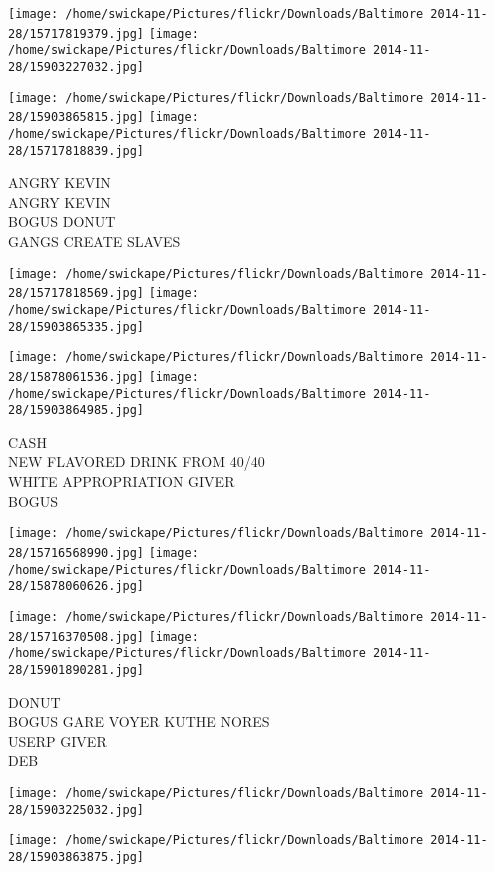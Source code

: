 \documentclass[10pt,letterpaper]{article}
\begin{document}
\texttt{[image: /home/swickape/Pictures/flickr/Downloads/Baltimore 2014-11-28/15717819379.jpg]}
\texttt{[image: /home/swickape/Pictures/flickr/Downloads/Baltimore 2014-11-28/15903227032.jpg]}

\texttt{[image: /home/swickape/Pictures/flickr/Downloads/Baltimore 2014-11-28/15903865815.jpg]}
\texttt{[image: /home/swickape/Pictures/flickr/Downloads/Baltimore 2014-11-28/15717818839.jpg]}

ANGRY KEVIN\\
ANGRY KEVIN\\
BOGUS DONUT\\
GANGS CREATE SLAVES
\pagebreak

\texttt{[image: /home/swickape/Pictures/flickr/Downloads/Baltimore 2014-11-28/15717818569.jpg]}
\texttt{[image: /home/swickape/Pictures/flickr/Downloads/Baltimore 2014-11-28/15903865335.jpg]}

\texttt{[image: /home/swickape/Pictures/flickr/Downloads/Baltimore 2014-11-28/15878061536.jpg]}
\texttt{[image: /home/swickape/Pictures/flickr/Downloads/Baltimore 2014-11-28/15903864985.jpg]}

CASH\\
NEW FLAVORED DRINK FROM 40/40\\
WHITE APPROPRIATION GIVER\\
BOGUS
\pagebreak

\texttt{[image: /home/swickape/Pictures/flickr/Downloads/Baltimore 2014-11-28/15716568990.jpg]}
\texttt{[image: /home/swickape/Pictures/flickr/Downloads/Baltimore 2014-11-28/15878060626.jpg]}

\texttt{[image: /home/swickape/Pictures/flickr/Downloads/Baltimore 2014-11-28/15716370508.jpg]}
\texttt{[image: /home/swickape/Pictures/flickr/Downloads/Baltimore 2014-11-28/15901890281.jpg]}

DONUT\\
BOGUS GARE VOYER KUTHE NORES\\
USERP GIVER\\
DEB
\pagebreak

\texttt{[image: /home/swickape/Pictures/flickr/Downloads/Baltimore 2014-11-28/15903225032.jpg]}

\vspace{0.25in}
\texttt{[image: /home/swickape/Pictures/flickr/Downloads/Baltimore 2014-11-28/15903863875.jpg]}
\end{document}
